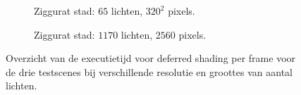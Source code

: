 \begin{figure}[t]
\begin{adjustbox}{minipage=\textwidth, scale=0.6}
\begin{subfigure}[b]{0.83\textwidth}
      \caption{Ziggurat stad: $65$ lichten, $320^2$ pixels.}
      \label{fig:hs-exec-frames-deferred:city-low}
    \end{subfigure}
  \end{adjustbox} %
  \begin{adjustbox}{minipage=\textwidth, scale=0.6}
    \begin{subfigure}[b]{0.83\textwidth}
      \centering
      \def\svgwidth{\textwidth}
      
      \caption{Ziggurat stad: $1170$ lichten, $2560$ pixels.}
      \label{fig:hs-exec-frames-deferred:city-high}
    \end{subfigure}
  \end{adjustbox}
  \caption{Overzicht van de executietijd voor deferred shading per frame voor de
           drie testscenes bij verschillende resolutie en groottes van aantal
           lichten.}
  \label{fig:hs-exec-frames-deferred}
\end{figure}

